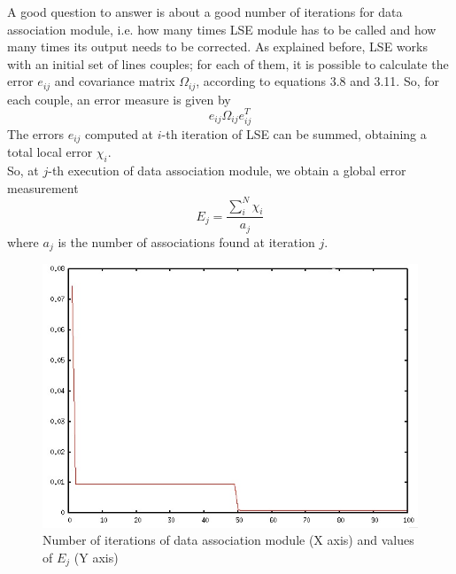 \documentclass[a4paper, onecolumn]{report}
\begin{document}
A good question to answer is about a good number of iterations for data association module, i.e. how many times LSE module has to be called and how many times its output needs to be corrected. As explained before, LSE works with an initial set of lines couples; for each of them, it is possible to calculate the error $e_{ij}$ and covariance matrix $\Omega_{ij}$, according to equations 3.8 and 3.11. So, for each couple, an error measure is given by 
\begin{equation}
	e_{ij}\Omega_{ij}e_{ij}^T
\end{equation}
The errors $e_{ij}$ computed at $i$-th iteration of LSE can be summed, obtaining a total local error $\chi_i$. \\
So, at $j$-th execution of data association module, we obtain a global error measurement
\begin{equation}
	E_j = \frac{\sum_i^N \chi_i}{a_j}
\end{equation}
where $a_j$ is the number of associations found at iteration $j$.
\begin{figure}[htbp]
\centering
\includegraphics[width=1.0\textwidth]{images/chi.jpeg}
\caption{Number of iterations of data association module (X axis) and values of $E_j$ (Y axis)}
\end{figure}


\listoffigures
\end{document}
